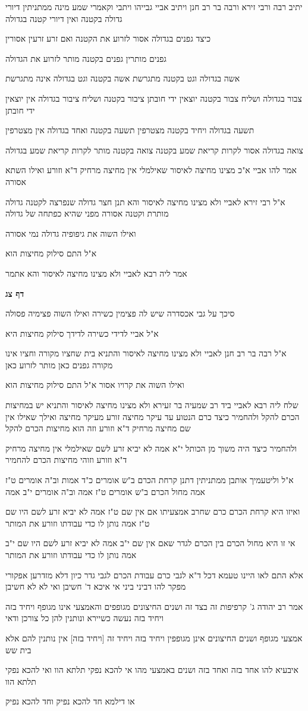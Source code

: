 \documentclass[12pt, openany]{book}
\newcommand{\sethebfont}{
\fontsize{10.5pt}{21.0pt} \selectfont
}
\newcommand{\textblock}[1]{
{\sethebfont #1\\}	
}
\newcommand{\sectname}{}
\newcommand{\newsection}[1]{
	\addcontentsline{toc}{section}{#1}
	\renewcommand{\sectname}{#1}	
	\vspace{-\baselineskip}
	\begin{center}
		\textbf{%
\fontsize{16pt}{16pt}\selectfont
			#1}
	\end{center}
	\vspace{-\baselineskip}
	\nopagebreak
}
\begin{document}
\textblock{יתיב רבה ורבי זירא ורבה בר רב חנן ויתיב אביי גבייהו ויתבי וקאמרי שמע מינה ממתניתין דיורי גדולה בקטנה ואין דיורי קטנה בגדולה}
\textblock{כיצד גפנים בגדולה אסור לזרוע את הקטנה ואם זרע זרעין אסורין}
\textblock{גפנים מותרין גפנים בקטנה מותר לזרוע את הגדולה}
\textblock{אשה בגדולה וגט בקטנה מתגרשת אשה בקטנה וגט בגדולה אינה מתגרשת}
\textblock{צבור בגדולה ושליח צבור בקטנה יוצאין ידי חובתן ציבור בקטנה ושליח ציבור בגדולה אין יוצאין ידי חובתן}
\textblock{תשעה בגדולה ויחיד בקטנה מצטרפין תשעה בקטנה ואחד בגדולה אין מצטרפין}
\textblock{צואה בגדולה אסור לקרות קריאת שמע בקטנה צואה בקטנה מותר לקרות קריאת שמע בגדולה}
\textblock{אמר להו אביי א"כ מצינו מחיצה לאיסור שאילמלי אין מחיצה מרחיק ד"א וזורע ואילו השתא אסורה}
\textblock{א"ל רבי זירא לאביי ולא מצינו מחיצה לאיסור והא תנן חצר גדולה שנפרצה לקטנה גדולה מותרת וקטנה אסורה מפני שהיא כפתחה של גדולה}
\textblock{ואילו השוה את גיפופיה גדולה נמי אסורה}
\textblock{א"ל התם סילוק מחיצות הוא}
\textblock{אמר ליה רבא לאביי ולא מצינו מחיצה לאיסור והא אתמר}
\newsection{דף צג}
\textblock{סיכך על גבי אכסדרה שיש לה פצימין כשירה ואילו השוה פצימיה פסולה}
\textblock{א"ל אביי לדידי כשירה לדידך סילוק מחיצות היא}
\textblock{א"ל רבה בר רב חנן לאביי ולא מצינו מחיצה לאיסור והתניא בית שחציו מקורה וחציו אינו מקורה גפנים כאן מותר לזרוע כאן}
\textblock{ואילו השוה את קרויו אסור א"ל התם סילוק מחיצות הוא}
\textblock{שלח ליה רבא לאביי ביד רב שמעיה בר זעירא ולא מצינו מחיצה לאיסור והתניא יש במחיצות הכרם להקל ולהחמיר כיצד כרם הנטוע עד עיקר מחיצה זורע מעיקר מחיצה ואילך שאילו אין שם מחיצה מרחיק ד"א וזורע וזה הוא מחיצות הכרם להקל}
\textblock{ולהחמיר כיצד היה משוך מן הכותל י"א אמה לא יביא זרע לשם שאילמלי אין מחיצה מרחיק ד"א וזורע וזוהי מחיצות הכרם להחמיר}
\textblock{א"ל וליטעמיך אותבן ממתניתין דתנן קרחת הכרם ב"ש אומרים כ"ד אמות וב"ה אומרים ט"ז אמה מחול הכרם ב"ש אומרים ט"ז אמה וב"ה אומרים י"ב אמה}
\textblock{ואיזו היא קרחת הכרם כרם שחרב אמצעיתו אם אין שם ט"ז אמה לא יביא זרע לשם היו שם ט"ז אמה נותן לו כדי עבודתו וזורע את המותר}
\textblock{אי זו היא מחול הכרם בין הכרם לגדר שאם אין שם י"ב אמה לא יביא זרע לשם היו שם י"ב אמה נותן לו כדי עבודתו וזורע את המותר}
\textblock{אלא התם לאו היינו טעמא דכל ד"א לגבי כרם עבודת הכרם לגבי גדר כיון דלא מזדרען אפקורי מפקר להו דביני ביני אי איכא ד' חשיבן ואי לא לא חשיבן}
\textblock{אמר רב יהודה ג' קרפיפות זה בצד זה ושנים החיצונים מגופפים והאמצעי אינו מגופף ויחיד בזה ויחיד בזה נעשה כשיירא ונותנין להן כל צורכן ודאי}
\textblock{אמצעי מגופף ושנים החיצונים אינן מגופפין ויחיד בזה ויחיד זה [ויחיד בזה] אין נותנין להם אלא בית שש}
\textblock{איבעיא להו אחד בזה ואחד בזה ושנים באמצעי מהו אי להכא נפקי תלתא הוו ואי להכא נפקי תלתא הוו}
\textblock{או דילמא חד להכא נפיק וחד להכא נפיק}
\end{document}
